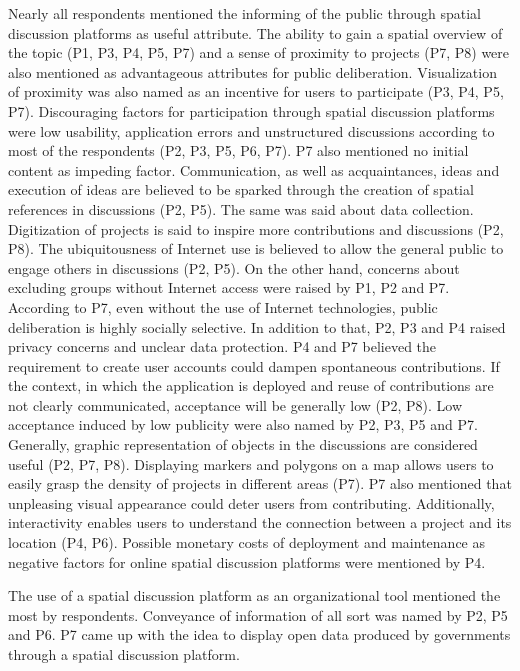 Nearly all respondents mentioned the informing of the public through spatial discussion platforms as useful attribute. The ability to gain a spatial overview of the topic (P1, P3, P4, P5, P7) and a sense of proximity to projects (P7, P8) were also mentioned as advantageous attributes for public deliberation. Visualization of proximity was also named as an incentive for users to participate (P3, P4, P5, P7). Discouraging factors for participation through spatial discussion platforms were low usability, application errors and unstructured discussions according to most of the respondents (P2, P3, P5, P6, P7). P7 also mentioned no initial content as impeding factor. Communication, as well as acquaintances, ideas and execution of ideas are believed to be sparked through the creation of spatial references in discussions (P2, P5). The same was said about data collection. Digitization of projects is said to inspire more contributions and discussions (P2, P8). The ubiquitousness of Internet use is believed to allow the general public to engage others in discussions (P2, P5). On the other hand, concerns about excluding groups without Internet access were raised by P1, P2 and P7. According to P7, even without the use of Internet technologies, public deliberation is highly socially selective. In addition to that, P2, P3 and P4 raised privacy concerns and unclear data protection. P4 and P7 believed the requirement to create user accounts could dampen spontaneous contributions. If the context, in which the application is deployed and reuse of contributions are not clearly communicated, acceptance will be generally low (P2, P8). Low acceptance induced by low publicity were also named by P2, P3, P5 and P7. Generally, graphic representation of objects in the discussions are considered useful (P2, P7, P8). Displaying markers and polygons on a map allows users to easily grasp the density of projects in different areas (P7). P7 also mentioned that unpleasing visual appearance could deter users from contributing. Additionally, interactivity enables users to understand the connection between a project and its location (P4, P6). Possible monetary costs of deployment and maintenance as negative factors for online spatial discussion platforms were mentioned by P4. 

The use of a spatial discussion platform as an organizational tool mentioned the most by respondents. Conveyance of information of all sort was named by P2, P5 and P6. P7 came up with the idea to display open data produced by governments through a spatial discussion platform.

